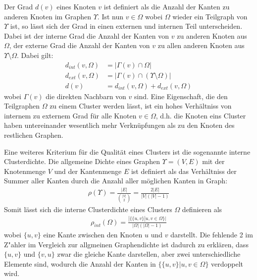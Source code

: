\documentclass[journal]{vgtc}
\begin{document}
  Der Grad $d(v)$ eines Knoten $v$ ist definiert als die Anzahl der Kanten zu anderen Knoten im
  Graphen $\Upsilon$. Ist nun $v \in \Omega$ wobei $\Omega$ wieder ein Teilgraph von $\Upsilon$
  ist, so lässt sich der Grad in einen externen und internen Teil unterscheiden. Dabei
  ist der interne Grad die Anzahl der Kanten von $v$ zu anderen Knoten aus $\Omega$, der externe
  Grad die Anzahl der Kanten von $v$ zu allen anderen Knoten aus $\Upsilon \setminus \Omega$.
  Dabei gilt:
    \begin{align}
      d_{int}(v, \Omega) &= |\Gamma(v) \cap \Omega |\\
      d_{ext}(v, \Omega) &= |\Gamma(v) \cap (\Upsilon \setminus \Omega) | \\
      d(v) &= d_{int}(v, \Omega) + d_{ext}(v, \Omega)
    \end{align}
  wobei $\Gamma(v)$ die direkten Nachbarn von $v$ sind.
  Eine Eigenschaft, die den Teilgraphen $\Omega$ zu einem Cluster werden lässt, ist ein hohes
  Verhältniss von internem zu externem Grad für alle Knoten $v \in \Omega$, d.h. die Knoten eins 
  Cluster haben untereinander wesentlich mehr Verknüpfungen als zu den Knoten des restlichen Graphen.
   
  Eine weiteres Kriterium für die Qualität eines Clusters ist die sogenannte interne Clusterdichte.
  Die allgemeine Dichte eines Graphen $\Upsilon = (V,E)$ mit der Knotenmenge $V$ und der Kantenmenge
  $E$ ist definiert als das Verhältniss der Summer aller Kanten durch die Anzahl aller 
  möglichen Kanten in Graph:
    \begin{align}
      \rho(\Upsilon) = \frac{|E|}{\binom{|V|}{2}} = \frac{2|E|}{|V|(|V|-1)}
    \end{align}
  Somit lässt sich die interne Clusterdichte eines Clusters $\Omega$ definieren als
    \begin{align}
      \rho_{int}(\Omega) = \frac{|\{\{u,v\} |u,v \in \Omega \}|}{|\Omega|(|\Omega|-1)}
    \end{align}
  wobei $\{u,v\}$ eine Kante zwischen den Knoten $u$ und $v$ darstellt. Die fehlende 2 im Z"ahler
  im Vergleich zur allgmeinen Graphendichte ist dadurch zu erklären, dass $\{u,v\}$ und $\{v,u\}$ 
  zwar die gleiche Kante darstellen, aber zwei unterschiedliche Elemente sind, wodurch die Anzahl
  der Kanten in $\{\{u,v\} |u,v \in \Omega \}$ verdoppelt wird.
  
\end{document}
